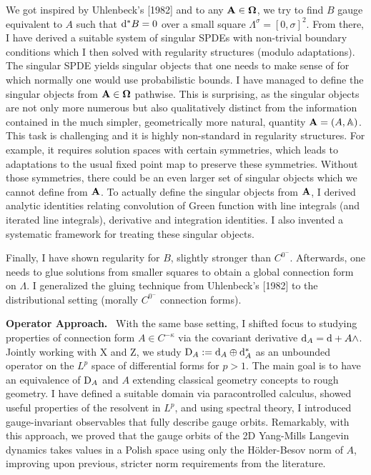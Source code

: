 \documentclass[./Research_statement.tex]{subfiles}
\begin{document}
We got inspired by Uhlenbeck's [1982] and to any $\mathbf A\in\boldsymbol{\Omega}$,  we try to find $B$ gauge equivalent to $A$ such that $\mathrm{d}^*B=0$ over a small square $\Lambda^\sigma=[0,\sigma]^2$. From there, I have derived a suitable system of singular SPDEs with non-trivial boundary conditions which I then solved with regularity structures (modulo adaptations). 
%
%
The singular SPDE yields singular objects 
that one needs to make sense of for which normally one would use probabilistic bounds. I have managed to define the singular objects from $\mathbf A\in\boldsymbol{\Omega}$ pathwise. This is surprising, as the singular objects are not only more numerous but also qualitatively distinct from the information contained in the much simpler, geometrically more natural, quantity $\mathbf A=(A,\mathbb A)$.  This task is challenging and it is highly non-standard in regularity structures. For example, it requires solution spaces  with certain symmetries, which leads to adaptations to the usual fixed point map to preserve these symmetries. Without those symmetries, there could be an even larger set of singular objects which we cannot define from $\mathbf A$. 
%
To actually define the singular objects from $\mathbf A$, I derived analytic identities relating convolution of Green function with line integrals (and iterated line integrals), derivative and integration identities. I also invented  a systematic framework for treating these singular objects. 

Finally, I have shown regularity for $B$, slightly stronger than $C^{0^-}$. Afterwards, one needs to glue solutions from smaller squares to obtain a global connection form on $\Lambda$. I generalized the gluing technique from Uhlenbeck's [1982] to the distributional setting (morally $C^{0^-}$ connection forms). 

\vspace{2pt}

\noindent \textbf{Operator Approach.}\ 
%
With the same base setting, I shifted focus to studying properties of connection form $A\in C^{-\kappa}$ via the covariant derivative $\mathrm{d}_A = \mathrm{d} + A\wedge $. Jointly working with X and Z, we study $\mathrm{D}_A:=\mathrm{d}_A\oplus\mathrm{d}_A^*$ as an unbounded operator on the $L^p$  space of differential forms for $p>1$.  The main goal is to have an equivalence of $\mathrm{D}_A$ and $A$ extending classical geometry concepts to rough geometry. I have defined a suitable domain via paracontrolled calculus, showed useful properties of the resolvent in $L^p$, and using spectral theory, I introduced gauge-invariant observables that fully describe gauge orbits. Remarkably, with this approach, we proved that the gauge orbits of the 2D Yang-Mills Langevin dynamics takes values in a Polish space using only the H\"older-Besov norm of $A$, improving upon previous, stricter norm requirements from the literature. 
\end{document}
